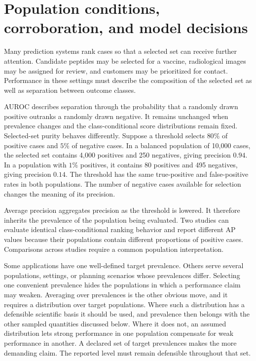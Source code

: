 \documentclass[11pt]{article}
\theoremstyle{remark}
\begin{document}
\section{Population conditions, corroboration, and model decisions}
\label{sec:motivation}

Many prediction systems rank cases so that a selected set can receive further attention. Candidate peptides may be selected for a vaccine, radiological images may be assigned for review, and customers may be prioritized for contact. Performance in these settings must describe the composition of the selected set as well as separation between outcome classes.

AUROC describes separation through the probability that a randomly drawn positive outranks a randomly drawn negative. It remains unchanged when prevalence changes and the class-conditional score distributions remain fixed. Selected-set purity behaves differently. Suppose a threshold selects $80\%$ of positive cases and $5\%$ of negative cases. In a balanced population of 10,000 cases, the selected set contains 4,000 positives and 250 negatives, giving precision $0.94$. In a population with $1\%$ positives, it contains 80 positives and 495 negatives, giving precision $0.14$. The threshold has the same true-positive and false-positive rates in both populations. The number of negative cases available for selection changes the meaning of its precision.

Average precision aggregates precision as the threshold is lowered. It therefore inherits the prevalence of the population being evaluated. Two studies can evaluate identical class-conditional ranking behavior and report different AP values because their populations contain different proportions of positive cases. Comparisons across studies require a common population interpretation.

Some applications have one well-defined target prevalence. Others serve several populations, settings, or planning scenarios whose prevalences differ. Selecting one convenient prevalence hides the populations in which a performance claim may weaken. Averaging over prevalences is the other obvious move, and it requires a distribution over target populations. Where such a distribution has a defensible scientific basis it should be used, and prevalence then belongs with the other sampled quantities discussed below. Where it does not, an assumed distribution lets strong performance in one population compensate for weak performance in another. A declared set of target prevalences makes the more demanding claim. The reported level must remain defensible throughout that set.
\end{document}
